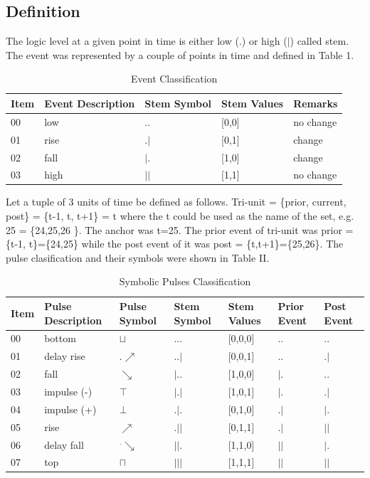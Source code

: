 \documentclass[10pt,journal]{IEEEtran}
\begin{document}
\subsection{Definition}
The logic level at a given point in time is either low (.) or high    ($\vert$) called stem. The event was represented by a couple of points in     time and defined in Table 1.
\begin{table}[H] \caption{Event Classification}\centering\begin{tabular}{|p{.4cm}|p{2cm}|p{1cm}|p{1cm}|p{1.5cm}|}\hline Item&Event Description &Stem Symbol&Stem Values &Remarks\\ \hline 00& low      &$..$ &[0,0] &no change\\ \hline 01& rise     &$.|$ &[0,1] &change\\ \hline 02& fall     &$|.$ &[1,0] &change\\ \hline 03& high     &$||$ &[1,1] &no change\\ \hline \end{tabular} \end{table} 
Let a tuple of 3 units of time be defined as follows.     Tri-unit = \{prior, current, post\} = \{t-1, t, t+1\} = t where the t     could be used as the name of the set, e.g. 25 = \{24,25,26 \}. The anchor     was t=25. The prior event of tri-unit was prior = \{t-1, t\}=\{24,25\} while     the post event of it was post = \{t,t+1\}=\{25,26\}. The pulse clasification     and their symbols were shown in Table II.
\begin{table}[H] \caption{Symbolic Pulses Classification}\centering\begin{tabular}{|p{.4cm}|p{1.6cm}|p{.9cm}|p{.9cm}|p{.8cm}|p{.5cm}|p{.5cm}|}\hline Item&Pulse Description &Pulse Symbol&Stem Symbol&Stem Values                        &Prior Event&Post Event            \\   \hline 00& bottom       &$\sqcup$ &$...$ &[0,0,0]                          &$..$ &$..$ \\ \hline 01& delay rise   &$.\nearrow$ &$..|$ &[0,0,1]                          &$..$ &$.|$ \\ \hline 02& fall         &$\searrow$ &$|..$ &[1,0,0]                          &$|.$ &$..$\\ \hline 03& impulse (-)  &$\top$ &$|.|$ &[1,0,1]                          &$|.$ &$.|$\\ \hline 04& impulse (+)  &$\bot$ &$.|.$ &[0,1,0]                          &$.|$ &$|.$\\ \hline 05& rise         &$\nearrow$ &$.||$ &[0,1,1]                          &$.|$ &$||$\\ \hline 06& delay fall   &$^.\searrow$ &$||.$ &[1,1,0]                          &$||$ &$|.$\\ \hline 07& top          &$\sqcap$ &$|||$ &[1,1,1]                          &$||$ &$||$\\ \hline \end{tabular} \end{table} 
\end{document}
